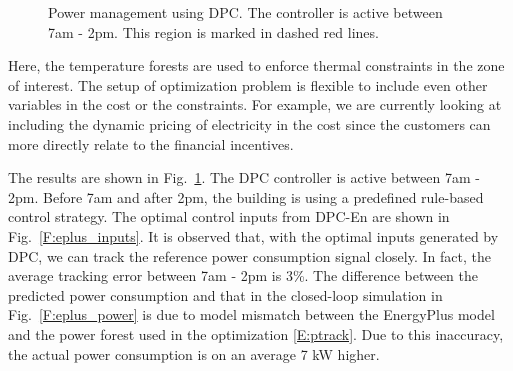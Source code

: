 \begin{figure}[h]
	\caption{Power management using DPC. The controller is active between 7am - 2pm. This region is marked in dashed red lines.}
	\captionsetup{justification=centering}
	\label{F:eplus_track}
\end{figure}

Here, the temperature forests are used to enforce thermal constraints in the zone of interest. The setup of optimization problem is flexible to include even other variables in the cost or the constraints. For example, we are currently looking at including the dynamic pricing of electricity in the cost since the customers can more directly relate to the financial incentives.

The results are shown in Fig.~\ref{F:eplus_track}. 
The DPC controller is active between 7am - 2pm. Before 7am and after 2pm, the building is using a predefined rule-based control strategy.
The optimal control inputs from DPC-En are shown in Fig.~\ref{F:eplus_inputs}. It is observed that, with the optimal inputs generated by DPC, we can track the reference power consumption signal closely. In fact, the average tracking error between 7am - 2pm is 3\%. The difference between the predicted power consumption and that in the closed-loop simulation in Fig.~\ref{F:eplus_power} is due to model mismatch between the EnergyPlus model and the power forest used in the optimization \eqref{E:ptrack}. Due to this inaccuracy, the actual power consumption is on an average 7 kW higher.

